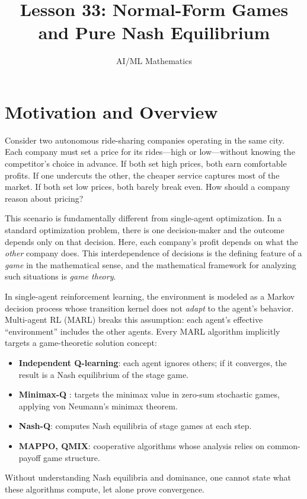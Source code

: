 \documentclass[11pt,a4paper]{article}
\title{Lesson 33: Normal-Form Games and Pure Nash Equilibrium}
\author{AI/ML Mathematics}
\date{}
\begin{document}
\maketitle
\tableofcontents
\newpage


\section{Motivation and Overview}
\label{sec:motivation}

Consider two autonomous ride-sharing companies operating in the same city.
Each company must set a price for its rides---high or low---without knowing
the competitor's choice in advance.  If both set high prices, both earn
comfortable profits.  If one undercuts the other, the cheaper service
captures most of the market.  If both set low prices, both barely break
even.  How should a company reason about pricing?

This scenario is fundamentally different from single-agent optimization.
In a standard optimization problem, there is one decision-maker and the
outcome depends only on that decision.  Here, each company's profit
depends on what the \emph{other} company does.  This interdependence of
decisions is the defining feature of a \emph{game} in the mathematical
sense, and the mathematical framework for analyzing such situations is
\emph{game theory}.

\begin{rlconnection}
In single-agent reinforcement learning, the environment is modeled as a
Markov decision process whose transition kernel does not \emph{adapt} to
the agent's behavior.  Multi-agent RL (MARL) breaks this assumption: each
agent's effective ``environment'' includes the other agents.  Every MARL
algorithm implicitly targets a game-theoretic solution concept:
\begin{itemize}[nosep]
    \item \textbf{Independent Q-learning}: each agent ignores others; if it
    converges, the result is a Nash equilibrium of the stage game.
    \item \textbf{Minimax-Q} \citep{shoham2008}: targets the minimax value in
    zero-sum stochastic games, applying von Neumann's minimax theorem.
    \item \textbf{Nash-Q}: computes Nash equilibria of stage games at each step.
    \item \textbf{MAPPO, QMIX}: cooperative algorithms whose analysis relies on
    common-payoff game structure.
\end{itemize}
Without understanding Nash equilibria and dominance, one cannot state what
these algorithms compute, let alone prove convergence.
\end{rlconnection}
\end{document}
